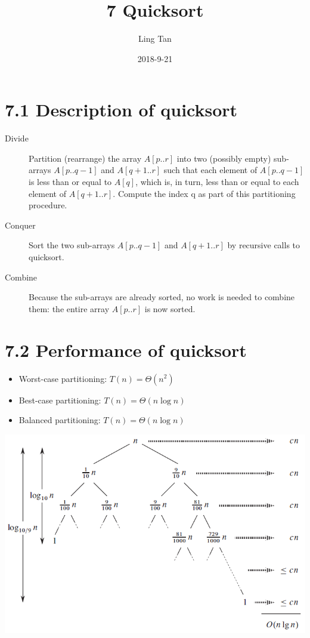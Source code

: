 \documentclass[a4paper]{article}
\title{7 Quicksort}
\author{Ling Tan}
\date{2018-9-21}
\begin{document}
\maketitle

\section*{7.1 Description of quicksort}
\begin{description}
\item[Divide] Partition (rearrange) the array $A[p..r]$ into two (possibly empty) sub-arrays $A[p..q-1]$ and $A[q+1..r]$ such that each element of $A[p..q-1]$ is less than or equal to $A[q]$, which is, in turn, less than or equal to each element of $A[q+1..r]$. Compute the index q as part of this partitioning procedure.
\item[Conquer] Sort the two sub-arrays $A[p..q-1]$ and $A[q+1..r]$ by recursive calls to quicksort.
\item[Combine] Because the sub-arrays are already sorted, no work is needed to combine them: the entire array $A[p..r]$ is now sorted.
\end{description}
\section*{7.2 Performance of quicksort}
\begin{itemize}
    \item Worst-case partitioning: $T(n)=\Theta(n^2)$
    \item Best-case partitioning: $T(n)=\Theta(n\log n)$
    \item Balanced partitioning: $T(n)=\Theta(n\log n)$
\end{itemize}
\includegraphics[scale=0.7]{"Balanced partitioning"}
\end{document}
